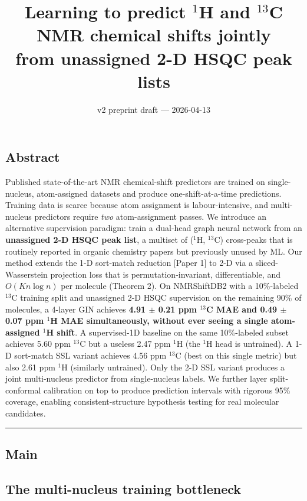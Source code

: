 \documentclass[11pt,a4paper]{article}
\title{\textbf{Learning to predict $^{1}$H and $^{13}$C NMR chemical shifts jointly\\from unassigned 2-D HSQC peak lists}}
\author{v2 preprint draft --- 2026-04-13}
\date{}
\begin{document}
\maketitle
\subsection{Abstract}\label{abstract}

Published state-of-the-art NMR chemical-shift predictors are trained on single-nucleus, atom-assigned datasets and produce one-shift-at-a-time predictions. Training data is scarce because atom assignment is labour-intensive, and multi-nucleus predictors require \emph{two} atom-assignment passes. We introduce an alternative supervision paradigm: train a dual-head graph neural network from an \textbf{unassigned 2-D HSQC peak list}, a multiset of (\(^{1}\)H, \(^{13}\)C) cross-peaks that is routinely reported in organic chemistry papers but previously unused by ML. Our method extends the 1-D sort-match reduction {[}Paper 1{]} to 2-D via a sliced-Wasserstein projection loss that is permutation-invariant, differentiable, and \(O(K n \log n)\) per molecule (Theorem 2). On NMRShiftDB2 with a 10\%-labeled \(^{13}\)C training split and unassigned 2-D HSQC supervision on the remaining 90\% of molecules, a 4-layer GIN achieves \textbf{4.91 \(\pm\) 0.21 ppm \(^{13}\)C MAE and 0.49 \(\pm\) 0.07 ppm \(^{1}\)H MAE simultaneously, without ever seeing a single atom-assigned \(^{1}\)H shift}. A supervised-1D baseline on the same 10\%-labeled subset achieves 5.60 ppm \(^{13}\)C but a useless 2.47 ppm \(^{1}\)H (the \(^{1}\)H head is untrained). A 1-D sort-match SSL variant achieves 4.56 ppm \(^{13}\)C (best on this single metric) but also 2.61 ppm \(^{1}\)H (similarly untrained). Only the 2-D SSL variant produces a joint multi-nucleus predictor from single-nucleus labels. We further layer split-conformal calibration on top to produce prediction intervals with rigorous 95\% coverage, enabling consistent-structure hypothesis testing for real molecular candidates.

\begin{center}\rule{0.5\linewidth}{0.5pt}\end{center}

\subsection{Main}\label{main}

\subsection{The multi-nucleus training bottleneck}\label{the-multi-nucleus-training-bottleneck}
\end{document}
